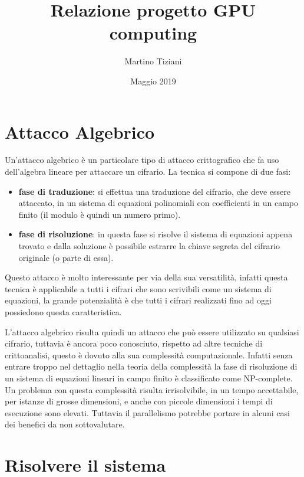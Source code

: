 \documentclass{article}
\title{Relazione progetto GPU computing}
\author{Martino Tiziani}
\date{Maggio 2019}
\begin{document}
\maketitle

\section{Attacco Algebrico}

Un'attacco algebrico è un particolare tipo di attacco crittografico che fa uso dell'algebra lineare per attaccare un cifrario. La tecnica si compone di due fasi:

\begin{itemize}
\item \textbf{fase di traduzione}: si effettua una traduzione del cifrario, che deve essere attaccato, in un sistema di equazioni polinomiali con coefficienti in un campo finito (il modulo è quindi un numero primo).

\item \textbf{fase di risoluzione}: in questa fase si risolve il sistema di equazioni appena trovato e dalla soluzione è possibile estrarre la chiave segreta del cifrario originale (o parte di essa).

\end{itemize}

Questo attacco è molto interessante per via della sua versatilità, infatti questa tecnica è applicabile a tutti i cifrari che sono scrivibili come un sistema di equazioni, la grande potenzialità è che tutti i cifrari realizzati fino ad oggi possiedono questa caratteristica. 

L'attacco algebrico risulta quindi un attacco che può essere utilizzato su qualsiasi cifrario, tuttavia è ancora poco conosciuto, rispetto ad altre tecniche di crittoanalisi, questo è dovuto alla sua complessità computazionale. Infatti senza entrare troppo nel dettaglio nella teoria della complessità la fase di risoluzione di un sistema di equazioni lineari in campo finito è classificato come NP-complete. Un problema con questa complessità risulta irrisolvibile, in un tempo accettabile, per istanze di grosse dimensioni, e anche con piccole dimensioni i tempi di esecuzione sono elevati. Tuttavia il parallelismo potrebbe portare in alcuni casi dei benefici da non sottovalutare.

\section{Risolvere il sistema}
\end{document}
